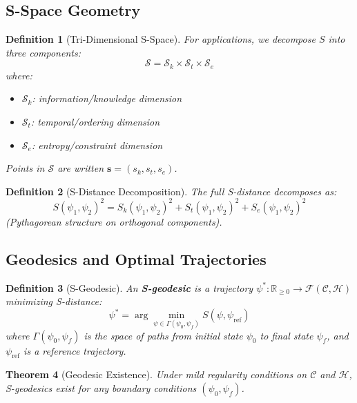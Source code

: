 \documentclass[12pt,a4paper]{article}
\newtheorem{theorem}{Theorem}[section]
\newtheorem{definition}[theorem]{Definition}
\begin{document}
\subsection{S-Space Geometry}

\begin{definition}[Tri-Dimensional S-Space]
\label{def:s_space}
For applications, we decompose $S$ into three components:
\begin{equation}
\mathcal{S} = \mathcal{S}_k \times \mathcal{S}_t \times \mathcal{S}_e
\end{equation}
where:
\begin{itemize}
\item $\mathcal{S}_k$: information/knowledge dimension
\item $\mathcal{S}_t$: temporal/ordering dimension
\item $\mathcal{S}_e$: entropy/constraint dimension
\end{itemize}
Points in $\mathcal{S}$ are written $\mathbf{s} = (s_k, s_t, s_e)$.
\end{definition}

\begin{definition}[S-Distance Decomposition]
\label{def:s_distance_decomposition}
The full S-distance decomposes as:
\begin{equation}
S(\psi_1, \psi_2)^2 = S_k(\psi_1, \psi_2)^2 + S_t(\psi_1, \psi_2)^2 + S_e(\psi_1, \psi_2)^2
\end{equation}
(Pythagorean structure on orthogonal components).
\end{definition}

\subsection{Geodesics and Optimal Trajectories}

\begin{definition}[S-Geodesic]
\label{def:s_geodesic}
An \textbf{S-geodesic} is a trajectory $\psi^*: \mathbb{R}_{\geq 0} \to \mathcal{F}(\mathcal{C}, \mathcal{H})$ minimizing S-distance:
\begin{equation}
\psi^* = \arg\min_{\psi \in \Gamma(\psi_0, \psi_f)} S(\psi, \psi_{\text{ref}})
\end{equation}
where $\Gamma(\psi_0, \psi_f)$ is the space of paths from initial state $\psi_0$ to final state $\psi_f$, and $\psi_{\text{ref}}$ is a reference trajectory.
\end{definition}

\begin{theorem}[Geodesic Existence]
\label{thm:geodesic_existence}
Under mild regularity conditions on $\mathcal{C}$ and $\mathcal{H}$, S-geodesics exist for any boundary conditions $(\psi_0, \psi_f)$.
\end{theorem}
\end{document}
